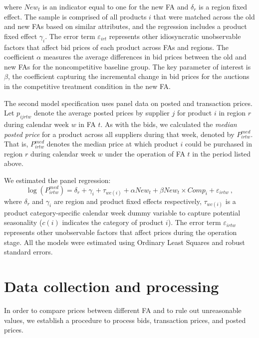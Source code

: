 \noindent where $New_t$ is an indicator equal to one for the new FA and $\delta_r$ is a region fixed effect. The sample is comprised of all products $i$ that were matched across the old and new FAs based on similar attributes, and the regression includes a product fixed effect $\gamma_i$. {The error term $\varepsilon_{irt}$ represents other idiosyncratic unobservable factors that affect bid prices of each product across FAs and  regions.} The coefficient $\alpha$ measures the average differences in bid prices between the old and new FAs for the noncompetitive baseline group. The key parameter of interest is $\beta$, the coefficient capturing the incremental change in bid prices for the auctions in the competitive treatment condition in the new FA.

The second model specification uses panel data on posted and transaction prices. Let $p_{ijrtw}$ denote the average posted prices by supplier $j$ for product $i$ in region $r$ during calendar week $w$ in FA $t$. As with the bids, we calculated the {\em median posted price} for a product across all suppliers during that week, denoted by $P^{med}_{irtw}$. That is, $P^{med}_{irtw}$ denotes the median price at which product $i$ could be purchased in region $r$ during calendar week $w$ under the operation of FA $t$ in the period listed above. 

We estimated the panel regression:
\begin{equation}
    \log (P^{med}_{irtw})= \delta_r + \gamma_i + \tau_{wc(i)} + \alpha New_{t} + \beta New_{t}\times Comp_{i} + \varepsilon_{irtw} \ ,
    \label{eq:reg_op_posted}
\end{equation}
\noindent where $\delta_r$ and $\gamma_i$ are region and product fixed effects respectively, $\tau_{wc(i)}$ is a product category-specific calendar week dummy variable to capture potential seasonality ($c(i)$ indicates the category of product $i$). {The error term $\varepsilon_{irtw}$ represents other unobservable factors that affect prices during the operation stage.} All the models were estimated using Ordinary Least Squares and robust standard errors. 

\section{Data collection and processing}
In order to compare prices between different FA and to rule out unreasonable values, we establish a procedure to process bids, transaction prices, and posted prices.

